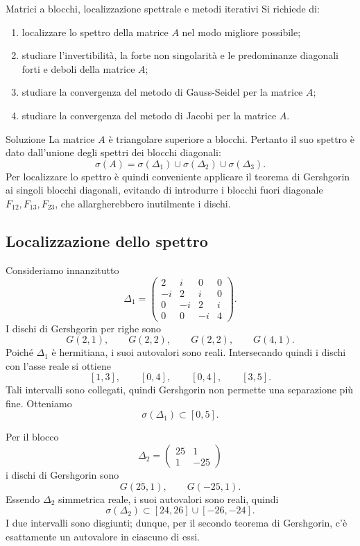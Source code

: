 \documentclass[a4paper]{article}
\begin{document}
\begin{snippetexercise}{Matrici a blocchi, localizzazione spettrale e metodi iterativi}
    Si richiede di:
    \begin{enumerate}
        \item localizzare lo spettro della matrice \(A\) nel modo migliore possibile;
        \item studiare l'invertibilità, la forte non singolarità e le predominanze diagonali forti e deboli della matrice \(A\);
        \item studiare la convergenza del metodo di Gauss-Seidel per la matrice \(A\);
        \item studiare la convergenza del metodo di Jacobi per la matrice \(A\).
    \end{enumerate}
\end{snippetexercise}

\begin{snippetsolution}{Soluzione}
    La matrice \(A\) è triangolare superiore a blocchi. Pertanto il suo spettro è dato dall'unione degli spettri dei blocchi diagonali:
    \[
        \sigma(A)=\sigma(\Delta_1)\cup\sigma(\Delta_2)\cup\sigma(\Delta_3).
    \]
    Per localizzare lo spettro è quindi conveniente applicare il teorema di Gershgorin ai singoli blocchi diagonali, evitando di introdurre i blocchi fuori diagonale \(F_{12},F_{13},F_{23}\), che allargherebbero inutilmente i dischi.

    \subsection*{Localizzazione dello spettro}

    Consideriamo innanzitutto
    \[
        \Delta_1=
        \begin{pmatrix}
            2 & i & 0 & 0\\
            -i & 2 & i & 0\\
            0 & -i & 2 & i\\
            0 & 0 & -i & 4
        \end{pmatrix}.
    \]
    I dischi di Gershgorin per righe sono
    \[
        G(2,1),\qquad G(2,2),\qquad G(2,2),\qquad G(4,1).
    \]
    Poiché \(\Delta_1\) è hermitiana, i suoi autovalori sono reali. Intersecando quindi i dischi con l'asse reale si ottiene
    \[
        [1,3],\qquad [0,4],\qquad [0,4],\qquad [3,5].
    \]
    Tali intervalli sono collegati, quindi Gershgorin non permette una separazione più fine. Otteniamo
    \[
        \sigma(\Delta_1)\subset [0,5].
    \]

    Per il blocco
    \[
        \Delta_2=
        \begin{pmatrix}
            25 & 1\\
            1 & -25
        \end{pmatrix}
    \]
    i dischi di Gershgorin sono
    \[
        G(25,1),
        \qquad
        G(-25,1).
    \]
    Essendo \(\Delta_2\) simmetrica reale, i suoi autovalori sono reali, quindi
    \[
        \sigma(\Delta_2)\subset [24,26]\cup[-26,-24].
    \]
    I due intervalli sono disgiunti; dunque, per il secondo teorema di Gershgorin, c'è esattamente un autovalore in ciascuno di essi.


\end{snippetsolution}
\end{document}
